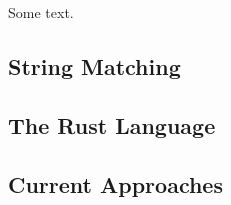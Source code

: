 Some text.

\subsection{String Matching}

\subsection{The Rust Language}

\subsection{Current Approaches}
